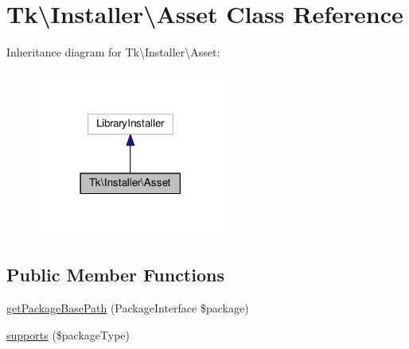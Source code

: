 \hypertarget{classTk_1_1Installer_1_1Asset}{\section{Tk\textbackslash{}Installer\textbackslash{}Asset Class Reference}
\label{classTk_1_1Installer_1_1Asset}
}


Inheritance diagram for Tk\textbackslash{}Installer\textbackslash{}Asset\+:\nopagebreak
\begin{figure}[H]
\begin{center}
\leavevmode
\includegraphics[width=174pt]{classTk_1_1Installer_1_1Asset__inherit__graph}
\end{center}
\end{figure}
\subsection*{Public Member Functions}
\begin{DoxyCompactItemize}
\item 
\hyperlink{classTk_1_1Installer_1_1Asset_a132a52a1330c45cf999b0d161ea4936a}{get\+Package\+Base\+Path} (Package\+Interface \$package)
\item 
\hyperlink{classTk_1_1Installer_1_1Asset_af3a8834946b96b149859e916b06569c4}{supports} (\$package\+Type)
\end{DoxyCompactItemize}


